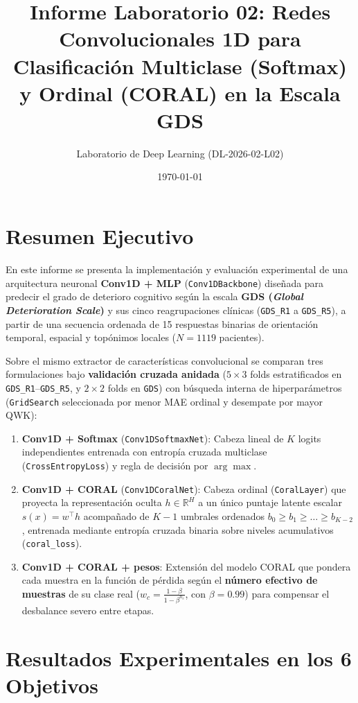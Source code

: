 \documentclass[11pt,a4paper]{article}
\title{\textbf{Informe Laboratorio 02: Redes Convolucionales 1D para Clasificaci\'on Multiclase (Softmax) y Ordinal (CORAL) en la Escala GDS}}
\author{Laboratorio de Deep Learning (DL-2026-02-L02)}
\date{\today}
\begin{document}
\maketitle
\tableofcontents
\newpage

\section{Resumen Ejecutivo}

En este informe se presenta la implementaci\'on y evaluaci\'on experimental de una arquitectura neuronal \textbf{Conv1D + MLP} (\texttt{Conv1DBackbone}) dise\~nada para predecir el grado de deterioro cognitivo seg\'un la escala \textbf{GDS (\textit{Global Deterioration Scale})} y sus cinco reagrupaciones cl\'inicas (\texttt{GDS\_R1} a \texttt{GDS\_R5}), a partir de una secuencia ordenada de 15 respuestas binarias de orientaci\'on temporal, espacial y top\'onimos locales ($N = 1119$ pacientes).

Sobre el mismo extractor de caracter\'isticas convolucional se comparan tres formulaciones bajo \textbf{validaci\'on cruzada anidada} ($5 \times 3$ folds estratificados en \texttt{GDS\_R1}--\texttt{GDS\_R5}, y $2 \times 2$ folds en \texttt{GDS}) con b\'usqueda interna de hiperpar\'ametros (\texttt{GridSearch} seleccionada por menor MAE ordinal y desempate por mayor QWK):
\begin{enumerate}
    \item \textbf{Conv1D + Softmax} (\texttt{Conv1DSoftmaxNet}): Cabeza lineal de $K$ logits independientes entrenada con entrop\'ia cruzada multiclase (\texttt{CrossEntropyLoss}) y regla de decisi\'on por $\arg\max$.
    \item \textbf{Conv1D + CORAL} (\texttt{Conv1DCoralNet}): Cabeza ordinal (\texttt{CoralLayer}) que proyecta la representaci\'on oculta $h \in \mathbb{R}^H$ a un \'unico puntaje latente escalar $s(x) = w^\top h$ acompa\~nado de $K-1$ umbrales ordenados $b_0 \ge b_1 \ge \dots \ge b_{K-2}$, entrenada mediante entrop\'ia cruzada binaria sobre niveles acumulativos (\texttt{coral\_loss}).
    \item \textbf{Conv1D + CORAL + pesos}: Extensi\'on del modelo CORAL que pondera cada muestra en la funci\'on de p\'erdida seg\'un el \textbf{n\'umero efectivo de muestras} de su clase real ($w_c = \frac{1-\beta}{1-\beta^{n_c}}$, con $\beta = 0.99$) para compensar el desbalance severo entre etapas.
\end{enumerate}

\section{Resultados Experimentales en los 6 Objetivos}
\end{document}
